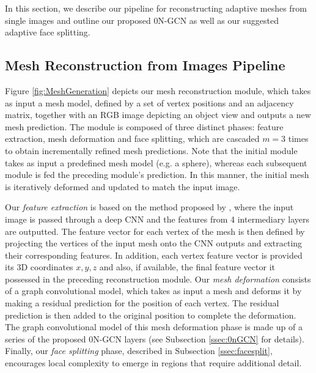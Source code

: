 \documentclass{article}
\begin{document}
In this section, we describe our pipeline for reconstructing adaptive meshes from single images and outline our proposed 0N-GCN as well as our suggested adaptive face splitting. 

\subsection{Mesh Reconstruction from Images Pipeline} 

Figure \ref{fig:MeshGeneration} depicts our mesh reconstruction module, which takes as input a mesh model, defined by a set of vertex positions and an adjacency matrix, together with an RGB image depicting an object view and outputs a new mesh prediction. The module is composed of three distinct phases: feature extraction, mesh deformation and face splitting, which are cascaded $m=3$ times to obtain incrementally refined mesh predictions. Note that the initial module takes as input a predefined mesh model (e.g. a sphere), whereas each subsequent module is fed the preceding module's prediction. In this manner, the initial mesh is iteratively deformed and updated to match the input image.

Our \emph{feature extraction} is based on the method proposed by \citet{Pixel2Mesh}, where the input image is passed through a deep CNN and the features from 4 intermediary layers are outputted. The feature vector for each vertex of the mesh is then defined by projecting the vertices of the input mesh onto the CNN outputs and extracting their corresponding features. In addition, each vertex feature vector is provided its 3D coordinates $x, y, z$ and also, if available, the final feature vector it possessed in the preceding reconstruction module.
Our \emph{mesh deformation} consists of a graph convolutional model, which takes as input a mesh and deforms it by making a residual prediction for the position of each vertex. The residual prediction is then added to the original position to complete the deformation. The graph convolutional model of this mesh deformation phase is made up of a series of the proposed 0N-GCN layers (see Subsection \ref{ssec:0nGCN} for details). Finally, our \emph{face splitting} phase, described in Subsection \ref{ssec:facesplit}, encourages local complexity to emerge in regions that require additional detail.
\end{document}

